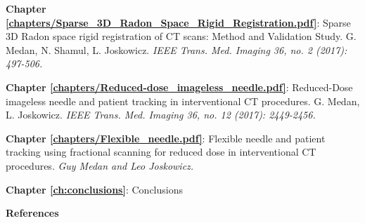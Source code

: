 \textbf{Chapter \ref{chapters/Sparse_3D_Radon_Space_Rigid_Registration.pdf}}: Sparse 3D Radon space rigid registration of CT scans: Method and Validation Study.
G. Medan, N. Shamul, L. Joskowicz. \textit{IEEE Trans. Med. Imaging 36, no. 2 (2017): 497-506.}

\textbf{Chapter \ref{chapters/Reduced-dose_imageless_needle.pdf}}: Reduced-Dose imageless needle and patient tracking in interventional CT procedures.
G. Medan, L. Joskowicz. \textit{IEEE Trans. Med. Imaging 36, no. 12 (2017): 2449-2456.}

\textbf{Chapter \ref{chapters/Flexible_needle.pdf}}: Flexible needle and patient tracking using fractional scanning for reduced dose in interventional CT procedures. \textit{Guy Medan and Leo Joskowicz.}

\textbf{Chapter \ref{ch:conclusions}}: Conclusions

\textbf{References}